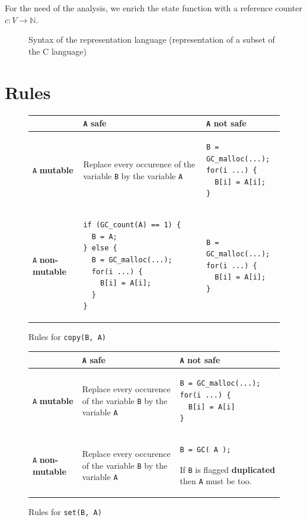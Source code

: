 \documentclass[12pt,a4paper,titlepage]{article}
\newcommand{\cl}[1]{\texttt{#1}}
\newcommand{\N}{\mathbb{N}}
\newcommand{\mut}{  \textbf{ mutable } }
\newcommand{\nmut}{ \textbf{ non-mutable } }
\newcommand{\safe}{ \textbf{ safe } }
\newcommand{\dupl}{ \textbf{ duplicated } }
\begin{document}
For the need of the analysis, we enrich the state function with a reference counter $c:V \rightarrow \N$.





\newpage
\begin{figure}[!ht]

\caption{Syntax of the representation language (representation of a subset of the C language)}
\label{fig:Csyntax}
\end{figure}


\newpage
\section{Rules}
\label{Rules}


\begin{figure}[!ht]
\begin{tabular}{|p{5.5cm}|p{5.5cm}|p{6cm}|}
\hline
             & \cl{A} \safe & \cl{A} not \safe \\ \hline
\cl{A} \mut  & Replace every occurence of the variable \cl{B} by the variable \cl{A} & \begin{lstlisting}
B = GC_malloc(...);
for(i ...) {
  B[i] = A[i];
}
\end{lstlisting} \\ \hline
\cl{A} \nmut & \begin{lstlisting}
if (GC_count(A) == 1) {
  B = A;
} else {
  B = GC_malloc(...);
  for(i ...) {
    B[i] = A[i];
  }
}
\end{lstlisting} & \begin{lstlisting}
B = GC_malloc(...);
for(i ...) {
  B[i] = A[i];
}
\end{lstlisting} \\ \hline
\end{tabular}
\caption{Rules for \cl{copy(B, A)}}
\end{figure}



\begin{figure}[!ht]
\begin{tabular}{|p{5.5cm}|p{5.5cm}|p{6cm}|}
\hline
             & \cl{A} \safe & \cl{A} not \safe \\ \hline
\cl{A} \mut  & Replace every occurence of the variable \cl{B} by the variable \cl{A} & \begin{lstlisting}
B = GC_malloc(...);
for(i ...) {
  B[i] = A[i]
}
\end{lstlisting} \\ \hline
\cl{A} \nmut & Replace every occurence of the variable \cl{B} by the variable \cl{A} & \begin{lstlisting}
B = GC( A );
\end{lstlisting}
If \cl{B} is flagged \dupl then \cl{A} must be too.
\\ \hline
\end{tabular}
\caption{Rules for \cl{set(B, A)}}
\end{figure}
\end{document}
